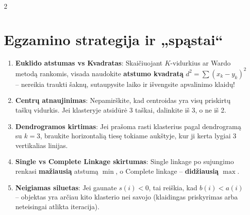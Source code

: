 \documentclass[9pt,a4paper]{article}
\begin{document}
\begin{multicols*}{2}
\section{Egzamino strategija ir „spąstai“}
\begin{enumerate}
    \item \textbf{Euklido atstumas vs Kvadratas}:
    Skaičiuojant $K$-vidurkius ar Wardo metodą rankomis, visada naudokite \textbf{atstumo kvadratą} $d^2 = \sum (x_k - y_k)^2$ -- nereikia traukti šaknų, sutaupysite laiko ir išvengsite apvalinimo klaidų!
    \item \textbf{Centrų atnaujinimas}:
    Nepamirškite, kad centroidas yra visų priskirtų taškų vidurkis. Jei klasteryje atsidūrė 3 taškai, dalinkite iš 3, o ne iš 2.
    \item \textbf{Dendrogramos kirtimas}:
    Jei prašoma rasti klasterius pagal dendrogramą su $k=3$, braukite horizontalią tiesę tokiame aukštyje, kur ji kerta lygiai 3 vertikalias linijas.
    \item \textbf{Single vs Complete Linkage skirtumas}:
    Single linkage po sujungimo renkasi \textbf{mažiausią} atstumą $\min$, o Complete linkage -- \textbf{didžiausią} $\max$.
    \item \textbf{Neigiamas siluetas}:
    Jei gaunate $s(i) < 0$, tai reiškia, kad $b(i) < a(i)$ -- objektas yra arčiau kito klasterio nei savojo (klaidingas priskyrimas arba neteisingai atlikta iteracija).
\end{enumerate}

\end{multicols*}
\end{document}
